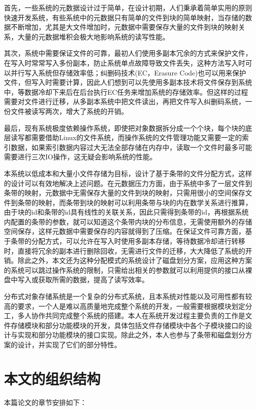 首先，一些系统的元数据设计过于简单，在设计初期，人们秉承着简单实用的原则快速开发系统，有些系统中的元数据只有简单的文件到块的简单映射，当存储的数据不断增加，尤其是大文件增加时，元数据中需要保存大量的文件到块的映射关系，大量的元数据堆积会极大地影响系统的读写性能。

其次，系统中需要保证文件的可靠，最初人们使用多副本冗余的方式来保护文件，在写入时常常写入多份副本，防止系统单点故障导致文件丢失，这种方法写入时可以并行写入系统但存储效率低；纠删码技术(EC，Erasure Code)也可以用来保护文件，但写入时需要计算，因此人们想到可以先使用多副本技术将文件保存到系统中，等数据冷却下来后在后台执行EC任务来增加系统的存储效率。但这样的过程需要对文件进行迁移，从多副本系统中把文件读出，再把文件写入纠删码系统，一份文件被读写两次，增大了系统的开销。

最后，现有系统极度依赖操作系统，即使把对象数据拆分成一个个块，每个块的底层读写都需要借助Linux的文件系统，而操作系统的文件管理功能又需要一定的索引数据，如果索引数据内容过大无法全部存储在内存中，读取一个文件时最多可能需要进行三次IO操作，这无疑会影响系统的性能。

本系统以低成本和大量小文件存储为目标，设计了基于条带的文件分配方式，这样的设计可以有效地解决上述问题。在元数据压力方面，由于系统中多了一层文件到条带的映射，元数据中无需保存大量的文件到块的映射，只需用很小的空间保存文件到条带的映射，而条带到块的映射可以利用条带与块的内在数学关系进行推算，由于块的id和条带的id具有线性的关联关系，因此只需得到条带的id，再根据系统内配置的条带的参数，就可以知道这个条带内块的分布信息，无需使用额外的存储空间保存，这样元数据中需要保存的内容就得到了压缩。在保证文件可靠方面，基于条带的分配方式，可以允许在写入时使用多副本存储，等待数据冷却进行转移时，直接将冗余的副本进行删除回收，无需进行文件的迁移，大大降低了系统的开销。除此之外，本文还为这种分配模式的系统设计了磁盘划分方案，应用这种方案的系统可以跳过操作系统的限制，只需给出相关的参数就可以利用提供的接口从裸盘中写入或获取所需的数据，提高了读写效率。

分布式对象存储系统是一个复杂的分布式系统，且本系统对性能以及可用性都有较高的要求，一个人是难以高质量地完成整个系统的开发，一般需要根据模块划定分工，多人协作共同完成整个系统的搭建。本人在系统开发过程主要负责的工作是文件存储模块和部分功能模块的开发，具体包括文件存储模块中各个子模块接口的设计与实现和部分功能模块的接口实现。除此之外，本人也参与了条带和磁盘划分方案的设计，并实现了它们的部分特性。

\section{本文的组织结构}%
本篇论文的章节安排如下：

